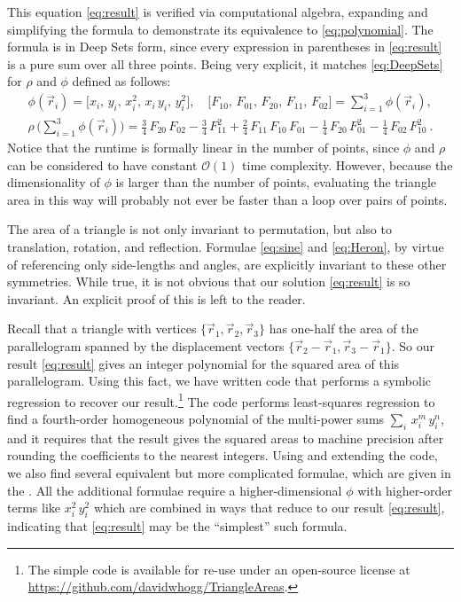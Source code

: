 \documentclass[10pt]{article}
\begin{document}
This equation \eqref{eq:result} is verified via computational algebra, expanding and simplifying the formula to demonstrate its equivalence to \eqref{eq:polynomial}.
The formula is in Deep Sets form, since
every expression in parentheses in \eqref{eq:result} is a pure sum over all three points.
Being very explicit, it matches \eqref{eq:DeepSets} for $\rho$ and $\phi$ defined as follows:
\begin{gather}
    \label{eq:resultDeepSets}
    \phi(\vec{r}_i) = \big[
        x_i, \,
        y_i, \,
        x_i^2, \,
        x_i \, y_i, \,
        y_i^2
    \big], \quad
    \big[
        F_{10}, \,
        F_{01}, \,
        F_{20}, \,
        F_{11}, \,
        F_{02}
    \big] = \sum_{i=1}^{3} \phi(\vec{r}_i),
    \\
    \rho \, \big( \sum_{i=1}^{3} \phi(\vec{r}_i) \big)
    = \frac{3}{4} \, F_{20} \, F_{02}
    - \frac{3}{4} \, F_{11}^2
    + \frac{2}{4} \, F_{11} \, F_{10} \, F_{01}
    - \frac{1}{4} \, F_{20} \, F_{01}^2
    - \frac{1}{4} \, F_{02} \, F_{10}^2~.
    \nonumber
\end{gather}
Notice that the runtime is formally linear in the number of points, since $\phi$ and $\rho$ can be considered to have constant $\mathcal{O}(1)$ time complexity.
However, because the dimensionality of $\phi$ is larger than the number of points, evaluating the triangle area in this way will probably not ever be faster than a loop over pairs of points.

The area of a triangle is not only invariant to permutation, but also to translation, rotation, and reflection.
Formulae \eqref{eq:sine} and \eqref{eq:Heron}, by virtue of referencing only side-lengths and angles, are explicitly invariant to these other symmetries.
While true, it is not obvious that our solution \eqref{eq:result} is so invariant.
An explicit proof of this is left to the reader.

Recall that a triangle with vertices $\{ \vec{r}_1, \vec{r}_2, \vec{r}_3 \}$ has one-half the area of the parallelogram spanned by the displacement vectors $\{ \vec{r}_2 - \vec{r}_1, \vec{r}_3 - \vec{r}_1 \}$.
So our result \eqref{eq:result} gives an integer polynomial for the squared area of this parallelogram.
Using this fact, we have written code that performs a symbolic regression to recover our result.\footnote{
    The simple code is available for re-use under an open-source license at \url{https://github.com/davidwhogg/TriangleAreas}.} 
The code performs least-squares regression to find a fourth-order homogeneous polynomial of the multi-power sums $\sum_i \, x_i^m \, y_i^n$, and it requires that the result gives the squared areas to machine precision after rounding the coefficients to the nearest integers.
Using and extending the code, we also find several equivalent but more complicated formulae, which are given in the .
All the additional formulae require a higher-dimensional $\phi$ with higher-order terms like $x_i^2 \, y_i^2$ which are combined in ways that reduce to our result \eqref{eq:result}, indicating that \eqref{eq:result} may be the ``simplest'' such formula.
\end{document}

